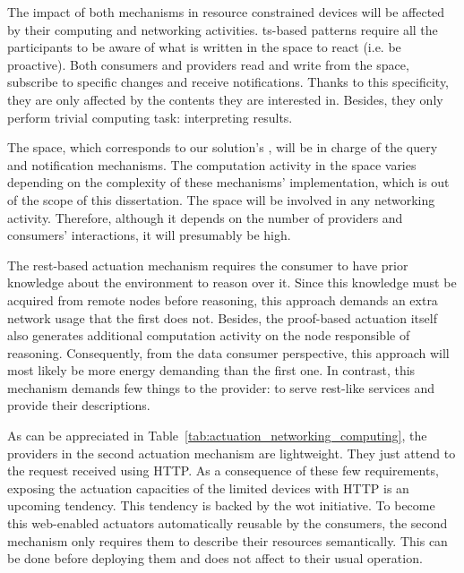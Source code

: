 


\bigskip

The impact of both mechanisms in resource constrained devices will be affected by their computing and networking activities.
\ac{ts}-based patterns require all the participants to be aware of what is written in the space to react (i.e. be proactive).
Both consumers and providers read and write from the space, subscribe to specific changes and receive notifications.
Thanks to this specificity, they are only affected by the contents they are interested in. %
Besides, they only perform trivial computing task: interpreting results. %


The space, which corresponds to our solution's \coordspace{}, will be in charge of the query and notification mechanisms.
The computation activity in the space varies depending on the complexity of these mechanisms' implementation, which is out of the scope of this dissertation.
The space will be involved in any networking activity.
Therefore, although it depends on the number of providers and consumers' interactions, it will presumably be high.


The \ac{rest}-based actuation mechanism requires the consumer to have prior knowledge about the environment to reason over it. %
Since this knowledge must be acquired from remote nodes before reasoning, this approach demands an extra network usage that the first does not.
Besides, the proof-based actuation itself also generates additional computation activity on the node responsible of reasoning.
Consequently, from the data consumer perspective, this approach will most likely be more energy demanding than the first one. %
In contrast, this mechanism demands few things to the provider: to serve \ac{rest}-like services and provide their descriptions. %





\bigskip


As can be appreciated in Table~\ref{tab:actuation_networking_computing}, the providers in the second actuation mechanism are lightweight.
They just attend to the request received using HTTP.
As a consequence of these few requirements, exposing the actuation capacities of the limited devices with HTTP is an upcoming tendency.
This tendency is backed by the \ac{wot} initiative.
To become this web-enabled actuators automatically reusable by the consumers, the second mechanism only requires them to describe their resources semantically.
This can be done before deploying them and does not affect to their usual operation.


